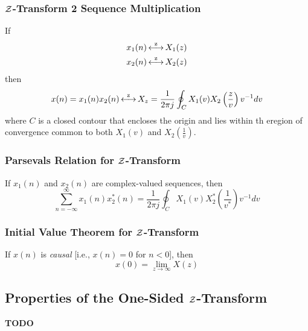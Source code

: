 \subsubsection{\texorpdfstring{$\operatorname{\mathcal{Z}}$-Transform}{Z-Transform} 2 Sequence Multiplication}\label{subsubsec:Z-Transform 2 Sequence Multiplication}
If
\begin{equation*}
  \begin{aligned}
    x_{1}(n) &\operatorname{\overset{z}{\longleftrightarrow}} X_{1}(z) \\
    x_{2}(n) &\operatorname{\overset{z}{\longleftrightarrow}} X_{2}(z) \\
  \end{aligned}
\end{equation*}
then
\begin{equation}\label{eq:Z-Transform 2 Sequence Multiplication}
  x(n) = x_{1}(n)x_{2}(n) \operatorname{\overset{z}{\longleftrightarrow}} X_{z} = \frac{1}{2 \pi j} \oint_{C} X_{1}(v)X_{2}\left( \frac{z}{v} \right) v^{-1} dv
\end{equation}
where $C$ is a closed contour that encloses the origin and lies within th eregion of convergence common to both $X_{1}(v)$ and $X_{2}(\frac{1}{v})$.

\subsubsection{Parsevals Relation for \texorpdfstring{$\operatorname{\mathcal{Z}}$-Transform}{Z-Transform}}\label{subsubsec:Parsevals Relation for Z-Transform}
If $x_{1}(n)$ and $x_{2}(n)$ are complex-valued sequences, then
\begin{equation}\label{eq:Parsevals Relation for Z-Transform}
  \sum\limits_{n=-\infty}^{\infty} x_{1}(n)x_{2}^{*}(n) = \frac{1}{2 \pi j} \oint_{C} X_{1}(v)X_{2}^{*} \left( \frac{1}{v^{*}} \right) v^{-1} dv
\end{equation}

\subsubsection{Initial Value Theorem for \texorpdfstring{$\operatorname{\mathcal{Z}}$-Transform}{Z-Transform}}\label{subsubsec:Initial Value Theorem for Z-Transform}
If $x(n)$ is \emph{causal} [i.e., $x(n)=0$ for $n<0$], then
\begin{equation}\label{eq:Initial Value Theorem for Z-Transform}
  x(0) = \lim\limits_{z\to\infty}X(z)
\end{equation}

\subsection{Properties of the One-Sided \texorpdfstring{$\operatorname{\mathcal{Z}}$-Transform}{Z-Transform}}\label{subsec:One-Sided Z-Transform Properties}
\textbf{TODO}

